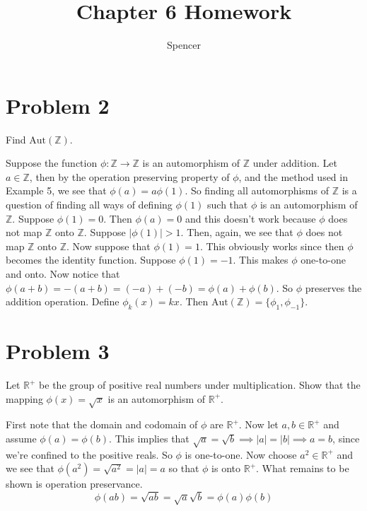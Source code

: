 \documentclass{article}
\title{Chapter 6 Homework}
\author{Spencer}
\begin{document}
\maketitle

\newcommand{\aut}{\mbox{Aut}}

\section*{Problem 2}

Find $\aut(\mathbb{Z})$.

Suppose the function $\phi:\mathbb{Z}\to\mathbb{Z}$ is an automorphism
of $\mathbb{Z}$ under addition.  Let $a\in\mathbb{Z}$, then by the operation
preserving property of $\phi$, and the method used in Example 5,
we see that $\phi(a) = a\phi(1)$.  So finding all automorphisms of $\mathbb{Z}$
is a question of finding all ways of defining $\phi(1)$ such that $\phi$ is
an automorphism of $\mathbb{Z}$.  Suppose $\phi(1)=0$.  Then $\phi(a)=0$ and
this doesn't work because $\phi$ does not map $\mathbb{Z}$ onto $\mathbb{Z}$.
Suppose $|\phi(1)|>1$.  Then, again, we see that $\phi$ does not map $\mathbb{Z}$
onto $\mathbb{Z}$.  Now suppose that $\phi(1)=1$.  This obviously works since
then $\phi$ becomes the identity function.  Suppose $\phi(1)=-1$.  This makes
$\phi$ one-to-one and onto.  Now
notice that $\phi(a+b) = -(a+b) = (-a) + (-b) = \phi(a)+\phi(b)$.  So $\phi$
preserves the addition operation.  Define $\phi_k(x)=kx$.
Then $\aut(\mathbb{Z})=\{\phi_1,\phi_{-1}\}$.

\section*{Problem 3}

Let $\mathbb{R}^{+}$ be the group of positive real numbers under multiplication.
Show that the mapping $\phi(x)=\sqrt{x}$ is an automorphism of $\mathbb{R}^{+}$.

First note that the domain and codomain of $\phi$ are $\mathbb{R}^{+}$.
Now let $a,b\in\mathbb{R}^{+}$ and assume $\phi(a)=\phi(b)$.
This implies that $\sqrt{a}=\sqrt{b}\implies|a|=|b|\implies a=b$, since
we're confined to the positive reals.  So $\phi$ is one-to-one.
Now choose $a^2\in\mathbb{R}^{+}$ and we see that $\phi(a^2)=\sqrt{a^2}=|a|=a$
so that $\phi$ is onto $\mathbb{R}^{+}$.  What remains to be shown is
operation preservance.
\begin{equation*}
\phi(ab) = \sqrt{ab} = \sqrt{a}\sqrt{b} = \phi(a)\phi(b)
\end{equation*}
\end{document}
